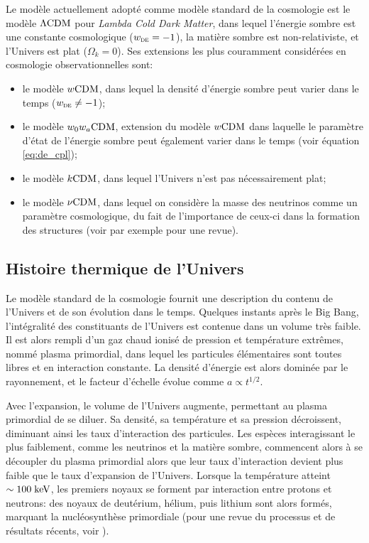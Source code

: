 Le modèle actuellement adopté comme modèle standard de la cosmologie est le modèle $\Lambda{\rm CDM}$ pour \textit{Lambda Cold Dark Matter}, dans lequel l'énergie sombre est une constante cosmologique ($w_\textsc{de} = -1$), la matière sombre est non-relativiste, et l'Univers est plat ($\Omega_k = 0$).
Ses extensions les plus couramment considérées en cosmologie observationnelles sont:
\begin{itemize}[leftmargin=*]
    \setlength\itemsep{5pt}
\item le modèle $w{\rm CDM}$, dans lequel la densité d'énergie sombre peut varier dans le temps ($w_\textsc{de} \neq -1$);
\item le modèle $w_0 w_a {\rm CDM}$, extension du modèle $w{\rm CDM}$ dans laquelle le paramètre d'état de l'énergie sombre peut également varier dans le temps (voir équation \ref{eq:de_cpl});
\item le modèle $k{\rm CDM}$, dans lequel l'Univers n'est pas nécessairement plat;
\item le modèle $\nu{\rm CDM}$, dans lequel on considère la masse des neutrinos comme un paramètre cosmologique, du fait de l'importance de ceux-ci dans la formation des structures (voir par exemple \cite{lesgourgues_massive_2006} pour une revue).
\end{itemize}

\subsection{Histoire thermique de l'Univers}

Le modèle standard de la cosmologie fournit une description du contenu de l'Univers et de son évolution dans le temps.
Quelques instants après le Big Bang, l'intégralité des constituants de l'Univers est contenue dans un volume très faible.
Il est alors rempli d'un gaz chaud ionisé de pression et température extrêmes, nommé plasma primordial, dans lequel les particules élémentaires sont toutes libres et en interaction constante.
La densité d'énergie est alors dominée par le rayonnement, et le facteur d'échelle évolue comme $a \propto t^{1/2}$.

Avec l'expansion, le volume de l'Univers augmente, permettant au plasma primordial de se diluer.
Sa densité, sa température et sa pression décroissent, diminuant ainsi les taux d'interaction des particules.
Les espèces interagissant le plus faiblement, comme les neutrinos et la matière sombre, commencent alors à se découpler du plasma primordial alors que leur taux d'interaction devient plus faible que le taux d'expansion de l'Univers.
Lorsque la température atteint $\sim 100 \;{\rm keV}$, les premiers noyaux se forment par interaction entre protons et neutrons: des noyaux de deutérium, hélium, puis lithium sont alors formés, marquant la nucléosynthèse primordiale (pour une revue du processus et de résultats récents, voir \cite{cyburt_big_2016}).

